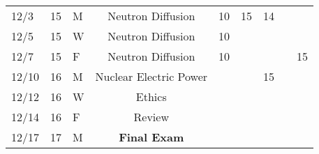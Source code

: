 \documentclass[11pt, a4paper]{article}
\begin{document}
\begin{table}[h]
\begin{center}
\begin{tabular}{lllcccccc}
12/3 & 15 & M & Neutron Diffusion & 10 & 15 & 14 &  &  \\
12/5 & 15 & W & Neutron Diffusion  &  10 &  &  &  &  \\
12/7 & 15 & F & Neutron Diffusion  & 10 &  &  &  & 15 \\
12/10 & 16 & M &  Nuclear Electric Power&  &  & 15 &  &  \\
12/12 & 16 & W &  Ethics &  &  &  &  &  \\
12/14 & 16 & F & Review  &  &  &  &  &  \\
12/17 & 17 & M & \textbf{Final Exam} &   &  &  &  &  \\
\end{tabular}
\end{center}
\end{table}
\FloatBarrier



\end{document}
